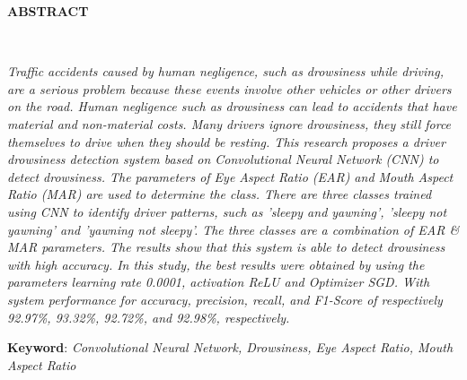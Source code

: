 \clearpage

\begin{minipage}{\textwidth}

\centering
\end{minipage}

\vspace{1em}

\normalsize \bfseries \centering \MakeUppercase{Abstract}
% 
\\[2\baselineskip]

\justifying \normalfont \normalsize

{

\textit{Traffic accidents caused by human negligence, such as drowsiness while driving, are a serious problem because these events involve other vehicles or other drivers on the road. Human negligence such as drowsiness can lead to accidents that have material and non-material costs. Many drivers ignore drowsiness, they still force themselves to drive when they should be resting. This research proposes a driver drowsiness detection system based on Convolutional Neural Network (CNN) to detect drowsiness. The parameters of Eye Aspect Ratio (EAR) and Mouth Aspect Ratio (MAR) are used to determine the class. There are three classes trained using CNN to identify driver patterns, such as 'sleepy and yawning', 'sleepy not yawning' and 'yawning not sleepy'. The three classes 
are a combination of EAR \& MAR parameters. The results show that this system is able to detect drowsiness with high accuracy. In this study, the best results were obtained by using the parameters \textit{learning rate} 0.0001, \textit{activation} ReLU and \textit{Optimizer} SGD. With system performance for accuracy, precision, recall, and F1-Score of respectively 92.97\%, 93.32\%, 92.72\%, and 92.98\%, respectively.
}

}

\textbf{Keyword}: \textit{Convolutional Neural Network, Drowsiness, Eye Aspect Ratio, Mouth
Aspect Ratio}

\clearpage